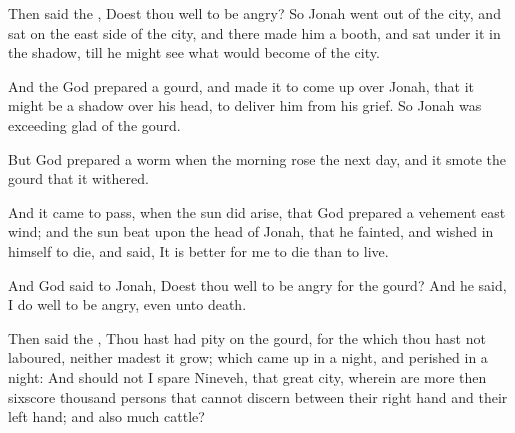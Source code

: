 \verse Then said the \LORD, Doest thou well to be angry?  \verse So Jonah went out of the city, and sat on the east side of the city, and there made him a booth, and sat under it in the shadow, till he might see what would become of the city.

\verse And the \LORD God prepared a gourd, and made it to come up over Jonah, that it might be a shadow over his head, to deliver him from his grief. So Jonah was exceeding glad of the gourd.

\verse But God prepared a worm when the morning rose the next day, and it smote the gourd that it withered.

\verse And it came to pass, when the sun did arise, that God prepared a vehement east wind; and the sun beat upon the head of Jonah, that he fainted, and wished in himself to die, and said, It is better for me to die than to live.

\verse And God said to Jonah, Doest thou well to be angry for the gourd?  And he said, I do well to be angry, even unto death.

\verse Then said the \LORD, Thou hast had pity on the gourd, for the which thou hast not laboured, neither madest it grow; which came up in a night, and perished in a night: \verse And should not I spare Nineveh, that great city, wherein are more then sixscore thousand persons that cannot discern between their right hand and their left hand; and also much cattle?

